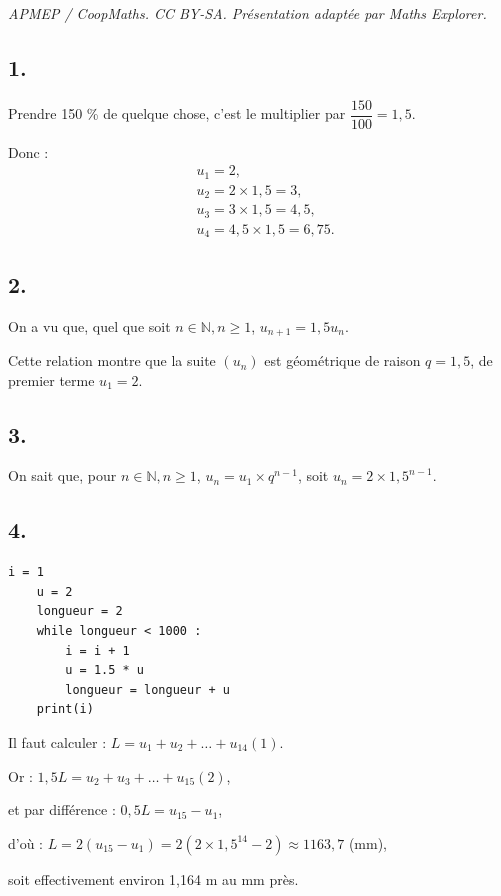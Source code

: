 \documentclass[10pt]{article}
\begin{document}
\noindent\textit{APMEP / CoopMaths. CC BY-SA. Présentation adaptée par Maths Explorer.}\par\medskip
\subsection*{1.}

Prendre 150 \% de quelque chose, c'est le multiplier par \(\dfrac{150}{100} = 1{,}5\).

Donc :
\begin{align*}
&u_1 = 2, \\
&u_2 = 2 \times 1{,}5 = 3, \\
&u_3 = 3 \times 1{,}5 = 4{,}5, \\
&u_4 = 4{,}5 \times 1{,}5 = 6{,}75.
\end{align*}

\subsection*{2.}

On a vu que, quel que soit \(n \in \mathbb{N}, n \geqslant 1\), \(u_{n+1} = 1{,}5 u_n\).
  
Cette relation montre que la suite \((u_n)\) est géométrique de raison \(q = 1{,}5\), de premier terme \(u_1 = 2\).

\subsection*{3.}

On sait que, pour \(n \in \mathbb{N}, n \geqslant 1\), \(u_n = u_1 \times q^{n-1}\), soit \(u_n = 2 \times 1{,}5^{n-1}\).

\subsection*{4.}

\begin{lstlisting}[style=python]
	i = 1
	u = 2
	longueur = 2
	while longueur < 1000 :
		i = i + 1
		u = 1.5 * u
		longueur = longueur + u
	print(i)
\end{lstlisting}

Il faut calculer : \(L = u_1 + u_2 + \dots + u_{14} (1)\).  

Or : \(1{,}5 L = u_2 + u_3 + \dots + u_{15} (2)\),

et par différence : \(0{,}5 L = u_{15} - u_1\),

d'où : \(L = 2(u_{15} - u_1) = 2(2 \times 1{,}5^{14} - 2) \approx 1163{,}7\) (mm),

soit effectivement environ 1{,}164 m au mm près.
\end{document}
